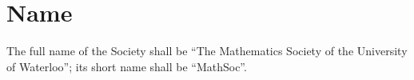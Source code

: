 \section{Name}
The full name of the Society shall be ``The Mathematics Society of the University
of Waterloo''; its short name shall be ``MathSoc''.